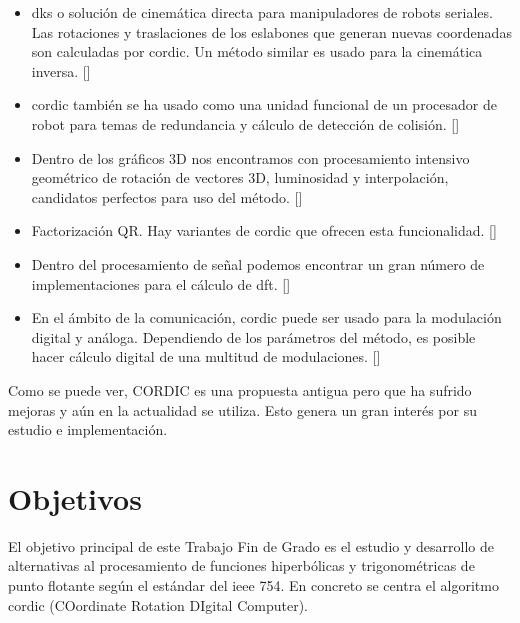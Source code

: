 \begin{itemize}
  \item \gls{dks} o solución de cinemática directa para manipuladores de robots seriales. Las rotaciones y traslaciones de los eslabones que generan nuevas coordenadas son calculadas por \gls{cordic}. Un método similar es usado para la cinemática inversa. []
  
  \item \gls{cordic} también se ha usado como una unidad funcional de un procesador de robot para temas de redundancia y cálculo de detección de colisión. []
  
  \item Dentro de los gráficos 3D nos encontramos con procesamiento intensivo geométrico de rotación de vectores 3D, luminosidad y interpolación, candidatos perfectos para uso del método. []
  
  \item Factorización QR. Hay variantes de \gls{cordic} que ofrecen esta funcionalidad. []
  
  \item  Dentro del procesamiento de señal podemos encontrar un gran número de implementaciones para el cálculo de \gls{dft}. []
  
  \item En el ámbito de la comunicación, \gls{cordic} puede ser usado para la modulación digital y análoga. Dependiendo de los parámetros del método, es posible hacer cálculo digital de una multitud de modulaciones. []
\end{itemize}

Como se puede ver, CORDIC es una propuesta antigua pero que ha sufrido mejoras y aún en la actualidad se utiliza. Esto genera un gran interés por su estudio e implementación.

\section{Objetivos}
\label{objetivos}

El objetivo principal de este Trabajo Fin de Grado es el estudio y desarrollo de alternativas al procesamiento de funciones hiperbólicas y trigonométricas de punto flotante según el estándar del \gls{ieee} 754. En concreto se centra el algoritmo \gls{cordic} (COordinate Rotation DIgital Computer).

